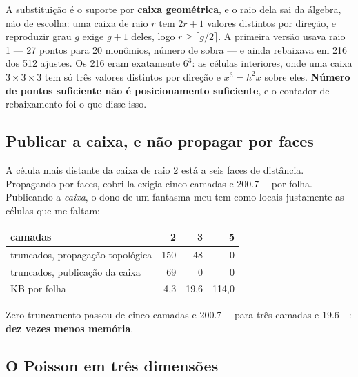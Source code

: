 A substituição é o suporte por \textbf{caixa geométrica}, e o raio dela sai da
álgebra, não de escolha: uma caixa de raio $r$ tem $2r+1$ valores distintos por
direção, e reproduzir grau $g$ exige $g+1$ deles, logo $r \geq \lceil g/2\rceil$.
A primeira versão usava raio 1 --- 27 pontos para 20 monômios, número de sobra ---
e ainda rebaixava em 216 dos 512 ajustes. Os 216 eram exatamente $6^3$: as células
interiores, onde uma caixa $3\times3\times3$ tem só três valores distintos por
direção e $x^3 = h^2 x$ sobre eles. \textbf{Número de pontos suficiente não é
posicionamento suficiente}, e o contador de rebaixamento foi o que disse isso.

\subsection{Publicar a caixa, e não propagar por faces}

A célula mais distante da caixa de raio 2 está a seis faces de distância.
Propagando por faces, cobri-la exigia cinco camadas e \SI{200.7}{\kilo\byte} por
folha. Publicando a \emph{caixa}, o dono de um fantasma meu tem como locais
justamente as células que me faltam:

\begin{center}
\begin{tabular}{lrrr}
\toprule
camadas & 2 & 3 & 5 \\
\midrule
truncados, propagação topológica & 150 & 48 & 0 \\
truncados, publicação da caixa   &  69 & 0  & 0 \\
KB por folha                     & 4,3 & 19,6 & 114,0 \\
\bottomrule
\end{tabular}
\end{center}

Zero truncamento passou de cinco camadas e \SI{200.7}{\kilo\byte} para três
camadas e \SI{19.6}{\kilo\byte}: \textbf{dez vezes menos memória}.


\subsection{O Poisson em três dimensões}

